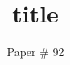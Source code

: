 \documentclass[10pt,twocolumn]{article}
\begin{document}
\title{title} \author{Paper \# 92} \date{}

\maketitle
\thispagestyle{empty}

\begin{abstract}
  
\end{abstract}

%


\newpage
\clearpage
 


\end{document}
